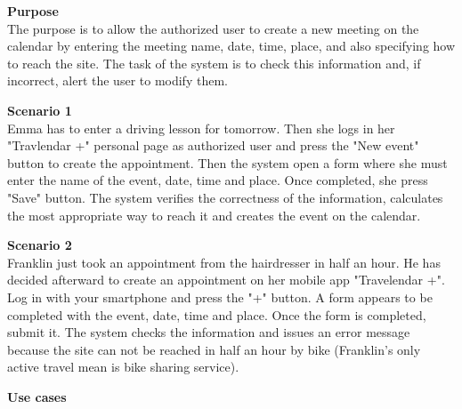 \documentclass{article}
\begin{document}
	\bigskip
	\noindent
	\textbf{Purpose} \\
	The purpose is to allow the authorized user to create a new meeting on the calendar by entering the meeting name, date, time, place, and also specifying how to reach the site. The task of the system is to check this information and, if incorrect, alert the user to modify them.
	
	\bigskip
	\noindent
	\textbf{Scenario 1} \\
	Emma has to enter a driving lesson for tomorrow. Then she logs in her "Travlendar +" personal page as authorized user and press the "New event" button to create the appointment. Then the system open a form where she must enter the name of the event, date, time and place. Once completed, she press "Save" button. The system verifies the correctness of the information, calculates the most appropriate way to reach it and creates the event on the calendar.
	
	\bigskip
	\noindent
	\textbf{Scenario 2} \\
	Franklin just took an appointment from the hairdresser in half an hour. He has decided afterward to create an appointment on her mobile app "Travelendar +". Log in with your smartphone and press the "+" button. A form appears to be completed with the event, date, time and place. Once the form is completed, submit it. The system checks the information and issues an error message because the site can not be reached in half an hour by bike (Franklin’s only active travel mean is bike sharing service).
	
	\bigskip
	\noindent
	\textbf{Use cases} \\
	
\end{document}
